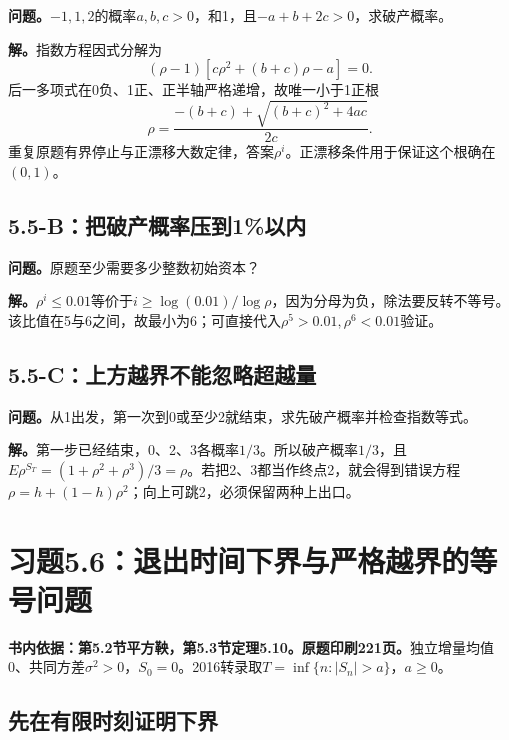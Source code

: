 \documentclass[11pt,a4paper,UTF8,fontset=fandol]{ctexart}
\begin{document}
\textbf{问题。}\(-1,1,2\)的概率\(a,b,c>0\)，和1，且\(-a+b+2c>0\)，求破产概率。

\textbf{解。}指数方程因式分解为 \[(\rho-1)[c\rho^2+(b+c)\rho-a]=0.\]
后一多项式在0负、1正、正半轴严格递增，故唯一小于1正根
\[\rho=\frac{-(b+c)+\sqrt{(b+c)^2+4ac}}{2c}.\]
重复原题有界停止与正漂移大数定律，答案\(\boxed{\rho^i}\)。正漂移条件用于保证这个根确在\((0,1)\)。

\subsection{5.5-B：把破产概率压到1\%以内}\label{bux628aux7834ux4ea7ux6982ux7387ux538bux52301ux4ee5ux5185}

\textbf{问题。}原题至少需要多少整数初始资本？

\textbf{解。}\(\rho^i\le0.01\)等价于\(i\ge\log(0.01)/\log\rho\)，因为分母为负，除法要反转不等号。该比值在5与6之间，故最小为\(\boxed6\)；可直接代入\(\rho^5>0.01,\rho^6<0.01\)验证。

\subsection{5.5-C：上方越界不能忽略超越量}\label{cux4e0aux65b9ux8d8aux754cux4e0dux80fdux5ffdux7565ux8d85ux8d8aux91cf}

\textbf{问题。}从1出发，第一次到0或至少2就结束，求先破产概率并检查指数等式。

\textbf{解。}第一步已经结束，0、2、3各概率\(1/3\)。所以破产概率\(\boxed{1/3}\)，且\(E\rho^{S_T}=(1+\rho^2+\rho^3)/3=\rho\)。若把2、3都当作终点2，就会得到错误方程\(\rho=h+(1-h)\rho^2\)；向上可跳2，必须保留两种上出口。

\bigskip

\section{习题5.6：退出时间下界与严格越界的等号问题}\label{ux4e60ux98985.6ux9000ux51faux65f6ux95f4ux4e0bux754cux4e0eux4e25ux683cux8d8aux754cux7684ux7b49ux53f7ux95eeux9898}

\textbf{书内依据：第5.2节平方鞅，第5.3节定理5.10。原题印刷221页。}独立增量均值0、共同方差\(\sigma^2>0\)，\(S_0=0\)。2016转录取\(T=\inf\{n:|S_n|>a\}\)，\(a\ge0\)。

\subsection{先在有限时刻证明下界}\label{ux5148ux5728ux6709ux9650ux65f6ux523bux8bc1ux660eux4e0bux754c}
\end{document}
